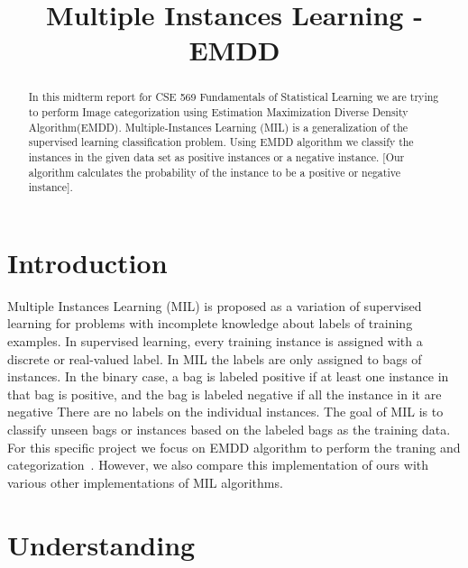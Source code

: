 \documentclass[conference,compsoc]{IEEEtran}
\begin{document}
\title{Multiple Instances Learning - EMDD}

\author{
\and
{}
}

\maketitle

\begin{abstract}
In this midterm report for CSE 569 Fundamentals of Statistical Learning we are trying to perform Image categorization using Estimation Maximization Diverse Density Algorithm(EMDD). Multiple-Instances Learning (MIL) is a generalization of the supervised learning classification problem. Using EMDD algorithm we classify the instances in the given data set as positive instances or a negative instance. [Our algorithm calculates the probability of the instance to be a positive or negative instance].
\end{abstract}


\IEEEpeerreviewmaketitle



\section{Introduction}
Multiple Instances Learning (MIL) is proposed as a variation of supervised learning for problems with incomplete knowledge about labels of training examples. In supervised learning, every training instance is assigned with a discrete or real-valued label. In MIL the labels are only assigned to bags of instances. In the binary case, a bag is labeled positive if at least one instance in that bag is positive, and the bag is labeled negative if all the instance in it are negative There are no labels on the individual instances. The goal of MIL is to classify unseen bags or instances based on the labeled bags as the training data. For this specific project we focus on EMDD algorithm to perform the traning and categorization~\cite{chen2004image}. However, we also compare this implementation of ours with various other implementations of MIL algorithms.

\section{Understanding}
\end{document}
